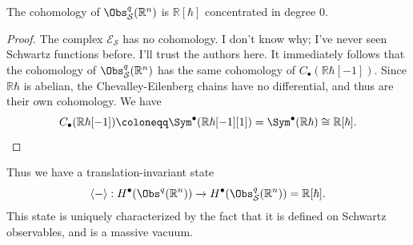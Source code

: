 \begin{lemma}\label{lma:4-9-4}
	The cohomology of $\Obs^{q} _{\mathcal{S} } (\mathbb{R} ^n)$ is $\mathbb{R} [\hbar ]$ concentrated in degree 0.
\end{lemma}
\begin{proof}
	The complex $\mathcal{E} _{\mathcal{S} }$ has no cohomology. I don't know why; I've never seen Schwartz functions before. I'll trust the authors here. It immediately follows that the cohomology of $\Obs^{q} _{\mathcal{S} } (\mathbb{R} ^n)$ has the same cohomology of $C_{\bullet} (\mathbb{R} \hbar [-1])$. Since $\mathbb{R} \hbar $ is abelian, the Chevalley-Eilenberg chains have no differential, and thus are their own cohomology. We have
	\[
		C_{\bullet} (\mathbb{R} \hbar [-1])\coloneqq \Sym ^{\bullet} (\mathbb{R} \hbar [-1][1])=\Sym ^{\bullet} (\mathbb{R} \hbar ) \cong \mathbb{R} [\hbar ]
	.\]
\end{proof}

Thus we have a translation-invariant state
\[
	\left\langle - \right\rangle : H^{\bullet} (\Obs^{q} (\mathbb{R} ^n)) \to H^{\bullet} (\Obs^{q} _{\mathcal{S} } (\mathbb{R} ^n))=\mathbb{R} [\hbar ]
.\]
This state is uniquely characterized by the fact that it is defined on Schwartz observables, and is a massive vacuum.

